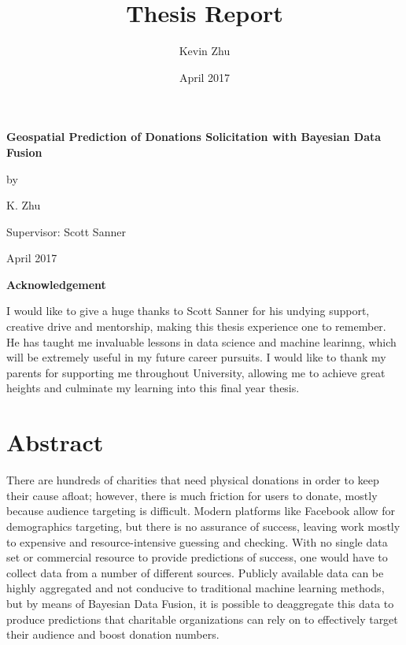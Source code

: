 \documentclass[12pt]{article}
\title{Thesis Report}
\date{April 2017}
\author{Kevin Zhu}
\begin{document}
\begin{titlepage}
   \centering
   {\Large\bfseries Geospatial Prediction of Donations Solicitation with Bayesian Data Fusion\par}
   \vspace{1cm}
   {by\par}
   {K. Zhu\par}
   Supervisor: Scott Sanner \par
   April 2017\par
\end{titlepage}

\newpage
\tableofcontents

\newpage
\listoffigures

\newpage 
\listoftables

\newpage
\vspace*{\fill}
{\centering\huge\bfseries Acknowledgement\par}
\bigskip
\noindent I would like to give a huge thanks to Scott Sanner for his undying support, creative drive and mentorship, making this thesis experience one to remember. He has taught me invaluable lessons in data science and machine learinng, which will be extremely useful in my future career pursuits. I would like to thank my parents for supporting me throughout University, allowing me to achieve great heights and culminate my learning into this final year thesis. 
\vspace*{\fill}

\newpage
\section{Abstract}
There are hundreds of charities that need physical donations in order to keep their cause afloat; however, there is much friction for users to donate, mostly because audience targeting is difficult. Modern platforms like Facebook allow for demographics targeting, but there is no assurance of success, leaving work mostly to expensive and resource-intensive guessing and checking. With no single data set or commercial resource to provide predictions of success, one would have to collect data from a number of different sources. Publicly available data can be highly aggregated and not conducive to traditional machine learning methods, but by means of Bayesian Data Fusion, it is possible to deaggregate this data to produce predictions that charitable organizations can rely on to effectively target their audience and boost donation numbers. 
\end{document}
